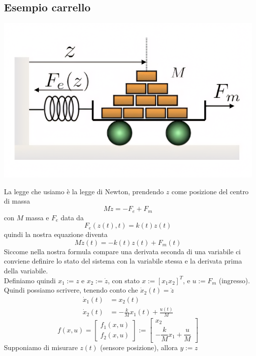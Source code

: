\documentclass{article}
\begin{document}
\subsection{Esempio carrello}
\begin{center}
    \includegraphics[scale=0.2]{Images/Es_carrello.png}
\end{center}
La legge che usiamo è la legge di Newton, prendendo $z$ come posizione del centro di massa
\[
    M \ddot  z = -F_e + F_m
\]
con $M$ massa e $F_e$ data da
\[
    F_e (z(t), t) = k(t)z(t)
\]
quindi la nostra equazione diventa
\[
    M \ddot  z(t) = -k(t)z(t) + F_m(t)
\]
Siccome nella nostra formula compare una derivata seconda di una variabile ci conviene definire lo stato del sistema con la variabile stessa e la derivata prima della variabile.\\
Definiamo quindi $x_1 := z$ e $x_2:=\dot z$, con stato $x := [x_1x_2]^T$, e $u := F_m$ (ingresso).
\vspace*{0.1cm}\\
Quindi possiamo scrivere, tenendo conto che $\dot x_2(t) = \ddot z$
\begin{align*}
    \dot x_1(t) &= x_2(t)\\
    \dot x_2(t) &= -\frac{k}{M} x_1(t) + \frac{u(t)}{M}
\end{align*}
\[
    f(x,u) = 
    \begin{bmatrix}
        f_1(x,u)\\
        f_2(x,u)
    \end{bmatrix}
    :=
    \begin{bmatrix}
        x_2\\
        -\dfrac{k}{M}x_1+\dfrac{u}{M}
    \end{bmatrix}
\]
Supponiamo di misurare $z(t)$ (sensore posizione), allora $y := z$
\end{document}
